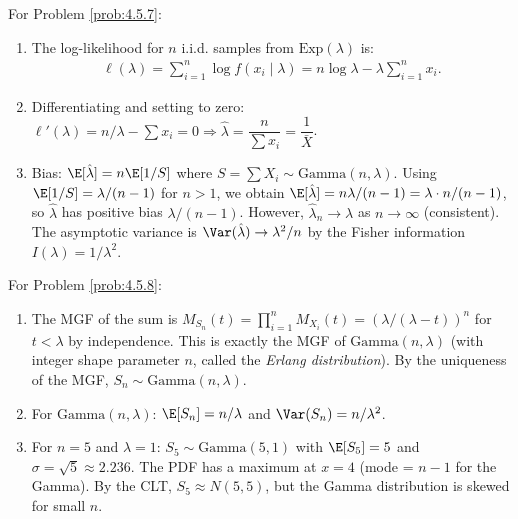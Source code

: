 \begin{solucion}
	\label{sol:4.5.7}
	For Problem \ref{prob:4.5.7}:
	\begin{enumerate}
		\item The log-likelihood for $n$ i.i.d. samples from $\text{Exp}(\lambda)$ is:
		\begin{align*}
			\ell(\lambda) = \sum_{i=1}^{n} \log f(x_i \mid \lambda) = n \log \lambda - \lambda \sum_{i=1}^{n} x_i.
		\end{align*}
		\item Differentiating and setting to zero: $\ell'(\lambda) = n/\lambda - \sum x_i = 0 \Rightarrow \hat{\lambda} = \dfrac{n}{\sum x_i} = \dfrac{1}{\bar{X}}$.
		\item Bias: $\E[\hat{\lambda}] = n \E[1/S]$ where $S = \sum X_i \sim \text{Gamma}(n, \lambda)$. Using $\E[1/S] = \lambda/(n-1)$ for $n > 1$, we obtain $\E[\hat{\lambda}] = n\lambda/(n-1) = \lambda \cdot n/(n-1)$, so $\hat{\lambda}$ has positive bias $\lambda/(n-1)$. However, $\hat{\lambda}_n \to \lambda$ as $n \to \infty$ (consistent). The asymptotic variance is $\Var(\hat{\lambda}) \to \lambda^{2}/n$ by the Fisher information $I(\lambda) = 1/\lambda^{2}$.
	\end{enumerate}
\end{solucion}

\begin{solucion}
	\label{sol:4.5.8}
	For Problem \ref{prob:4.5.8}:
	\begin{enumerate}
		\item The MGF of the sum is $M_{S_n}(t) = \prod_{i=1}^{n} M_{X_i}(t) = (\lambda/(\lambda - t))^{n}$ for $t < \lambda$ by independence. This is exactly the MGF of $\text{Gamma}(n, \lambda)$ (with integer shape parameter $n$, called the \emph{Erlang distribution}). By the uniqueness of the MGF, $S_n \sim \text{Gamma}(n, \lambda)$.
		\item For $\text{Gamma}(n, \lambda)$: $\E[S_n] = n/\lambda$ and $\Var(S_n) = n/\lambda^{2}$.
		\item For $n = 5$ and $\lambda = 1$: $S_5 \sim \text{Gamma}(5, 1)$ with $\E[S_5] = 5$ and $\sigma = \sqrt{5} \approx 2.236$. The PDF has a maximum at $x = 4$ (mode = $n - 1$ for the Gamma). By the CLT, $S_5 \approx N(5, 5)$, but the Gamma distribution is skewed for small $n$.
	\end{enumerate}
\end{solucion}

